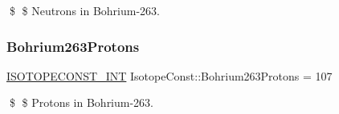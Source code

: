 \$ \$ Neutrons in Bohrium-\/263. \mbox{\label{group___isotope_const-_bohrium-_bh263_ga82f6efe19e6ddfce1a8f6f28561320ca}} 
\subsubsection{\texorpdfstring{Bohrium263\+Protons}{Bohrium263Protons}}
{\footnotesize\ttfamily \mbox{\hyperlink{group___isotope_const-_macros_ga5f18360b3e99483a35c32d789e62621c}{I\+S\+O\+T\+O\+P\+E\+C\+O\+N\+S\+T\+\_\+\+I\+NT}} Isotope\+Const\+::\+Bohrium263\+Protons = 107}

\$ \$ Protons in Bohrium-\/263. 